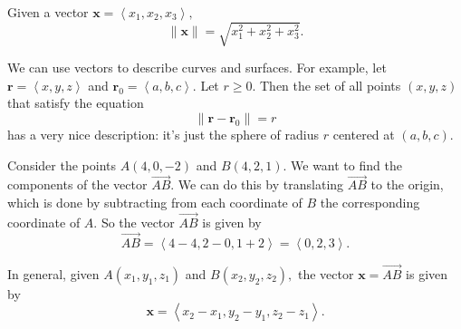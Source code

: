 \documentclass[10pt,]{book}
\theoremstyle{ptxplainnotitle}
\theoremstyle{ptxplaintitle}
\theoremstyle{ptxplainnotitle}
\theoremstyle{ptxplaintitle}
\theoremstyle{ptxplainnotitle}
\theoremstyle{ptxplaintitle}
\theoremstyle{ptxdefinitionnotitle}
\theoremstyle{ptxdefinitiontitle}
\theoremstyle{ptxdefinitionnotitle}
\theoremstyle{ptxdefinitiontitle}
\theoremstyle{ptxdefinitionnotitle}
\theoremstyle{ptxdefinitiontitle}
\theoremstyle{ptxdefinitionnotitle}
\theoremstyle{ptxdefinitiontitle}
\theoremstyle{ptxdefinitionnotitle}
\theoremstyle{ptxdefinitiontitle}
\numberwithin{equation}{section}
\newcommand{\vv}[1]{\mathbf{#1}}
\newcommand{\dotprod}[1]{\left\langle #1 \right\rangle}
\begin{document}
%
\par
\hypertarget{p-750}{}%
Given a vector \(\vv{x} = \dotprod{x_{1},x_{2},x_{3}},\)%
\begin{equation*}
\|\vv{x}\| = \sqrt{x_{1}^{2}+x_{2}^{2}+x_{3}^{2}}.
\end{equation*}
%
\begin{example}\label{example-a-vector-equation}
\hypertarget{p-751}{}%
We can use vectors to describe curves and surfaces. For example, let \(\vv{r} = \dotprod{x,y,z}\) and \(\vv{r}_{0} = \dotprod{a,b,c}\). Let \(r\geq0\). Then the set of all points \((x,y,z)\) that satisfy the equation%
%
\begin{equation*}
\|\vv{r}-\vv{r}_{0}\| = r
\end{equation*}
\hypertarget{p-752}{}%
has a very nice description: it's just the sphere of radius \(r\) centered at \((a,b,c)\).%
\end{example}
\begin{example}\label{example-finding-position-vectors}
\hypertarget{p-753}{}%
Consider the points \(A(4,0,-2)\) and \(B(4,2,1)\). We want to find the components of the vector \(\overrightarrow{AB}\). We can do this by translating \(\overrightarrow{AB}\) to the origin, which is done by subtracting from each coordinate of \(B\) the corresponding coordinate of \(A\). So the vector \(\overrightarrow{AB}\) is given by%
%
\begin{equation*}
\overrightarrow{AB} = \dotprod{4-4,2-0,1+2} = \dotprod{0,2,3}.
\end{equation*}
\end{example}
\hypertarget{p-754}{}%
In general, given \(A(x_{1},y_{1},z_{1})\) and \(B(x_{2},y_{2},z_{2}),\) the vector \(\vv{x} = \overrightarrow{AB}\) is given by%
%
\begin{equation*}
\vv{x} = \dotprod{x_{2}-x_{1},y_{2}-y_{1},z_{2}-z_{1}}.
\end{equation*}
\end{document}
